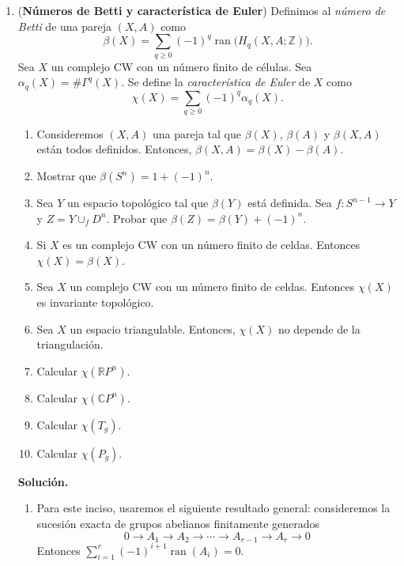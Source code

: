 \documentclass[11pt,a4paper]{article}
\theoremstyle{plain}
\theoremstyle{definition}
\theoremstyle{remark}
\newcommand{\RR}{\mathbb R}
\newcommand{\ZZ}{\mathbb Z}
\newcommand{\CC}{\mathbb C}
\DeclareMathOperator{\ran}{ran}
\begin{document}
\begin{enumerate}[label=\arabic*.,leftmargin=*]
\item (\textbf{Números de Betti y característica de Euler}) Definimos al
\emph{número de Betti} de una pareja $(X,A)$ como
\[
\beta(X)=\sum_{q\ge0}(-1)^q\ran\big(H_q(X,A;\ZZ)\big).
\]
Sea $X$ un complejo CW con un número finito de células. Sea
$\alpha_q(X)=\#\Gamma^q(X)$. Se define la \emph{característica de Euler} de
$X$ como
\[
\chi(X)=\sum_{q\ge0}(-1)^q\alpha_q(X).
\]
\begin{enumerate}[label=\alph*)]
\item Consideremos $(X,A)$ una pareja tal que $\beta(X)$, $\beta(A)$ y
$\beta(X,A)$ están todos definidos. Entonces, $\beta(X,A)=\beta(X)-\beta(A)$.
\item Mostrar que $\beta(S^n)=1+(-1)^n$.
\item Sea $Y$ un espacio topológico tal que $\beta(Y)$ está definida. Sea
$f:S^{n-1}\to Y$ y $Z=Y\cup_fD^n$. Probar que $\beta(Z)=\beta(Y)+(-1)^n$.
\item Si $X$ es un complejo CW con un número finito de celdas. Entonces
$\chi(X)=\beta(X)$.
\item Sea $X$ un complejo CW con un número finito de celdas. Entonces
$\chi(X)$ es invariante topológico.
\item Sea $X$ un espacio triangulable. Entonces, $\chi(X)$ no depende de la
triangulación.
\item Calcular $\chi(\RR P^n)$.
\item Calcular $\chi(\CC P^n)$.
\item Calcular $\chi(T_g)$.
\item Calcular $\chi(P_g)$.
\end{enumerate}

\noindent\textbf{Solución.}
\begin{enumerate}[label=\alph*)]
\item Para este inciso, usaremos el siguiente resultado general:
consideremos la sucesión exacta de grupos abelianos finitamente generados
\[
0\to A_1\to A_2\to\cdots\to A_{r-1}\to A_r\to0
\]
Entonces $\sum_{i=1}^r(-1)^{i+1}\ran(A_i)=0$.


\end{enumerate}
\end{enumerate}
\end{document}
